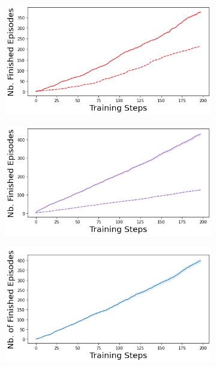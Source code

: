 \begin{figure}
    \begin{subfigure}{.245\textwidth}
        \includegraphics[width=\textwidth]{sections/011_icml2022/resources/acrobot-n_finished_training_episodes-dropout-training-strategy.png}
    \end{subfigure}
    \begin{subfigure}{.245\textwidth}
        \includegraphics[width=\textwidth]{sections/011_icml2022/resources/acrobot-n_finished_training_episodes-ensemble-training-strategy.png}
    \end{subfigure}
    \begin{subfigure}{.245\textwidth}
        \includegraphics[width=\textwidth]{sections/011_icml2022/resources/acrobot-n_finished_training_episodes-dkl-training-strategy.png}

\end{subfigure}
\end{figure}
